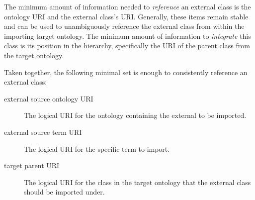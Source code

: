 \documentclass[a4paper,10pt,twocolumn]{article}
\begin{document}

The minimum amount of information needed to \textit{reference} an external class is the ontology URI and the external class's URI.
Generally, these items remain stable and can be used to unambiguously reference the external class from within the importing target ontology.
The minimum amount of information to \textit{integrate} this class is its position in the hierarchy, specifically the URI of the parent class from the target ontology.


Taken together, the following minimal set is enough to consistently reference an external class:
\begin{description}
 \item[external source ontology URI] The logical URI for the ontology containing the external to be imported. %
 \item[external source term URI] The logical URI for the specific term to import. %
 \item[target parent URI] The logical URI for the class in the target ontology that the external class should be imported under. %
 \end{description} 
 
\end{document}
